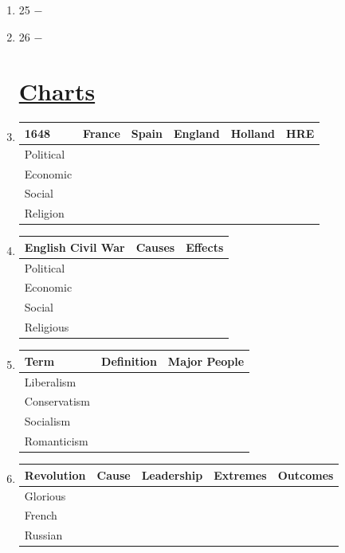 \documentclass[12pt]{article}
\begin{document}
\begin{enumerate}
\item 25 $-$ 

\item 26 $-$ 

\section{\underline{Charts}}

\item \begin{tabular}{|l|l|l|l|l|l|}

\hline
1648 & France & Spain & England & Holland & HRE \\
\hline
Political & & & & & \\
\hline
Economic & & & & & \\
\hline
Social & & & & & \\
\hline
Religion & & & & & \\
\hline


\end{tabular}

\item \begin{tabular}{|l|l|l|}

\hline
English Civil War & Causes & Effects \\
\hline
Political & & \\
\hline
Economic & & \\
\hline
Social & & \\
\hline
Religious & & \\
\hline

\end{tabular}

\item \begin{tabular}{|l|l|l|}

\hline
Term & Definition & Major People \\
\hline
Liberalism & & \\
\hline
Conservatism & & \\
\hline
Socialism & & \\
\hline
Romanticism & & \\
\hline
\end{tabular}

\item \begin{tabular}{|l|l|l|l|l|}

\hline
Revolution & Cause & Leadership & Extremes & Outcomes \\
\hline
Glorious & & & & \\
\hline
French & & & & \\
\hline
Russian & & & & \\
\hline
\end{tabular}


\end{enumerate}
\end{document}
